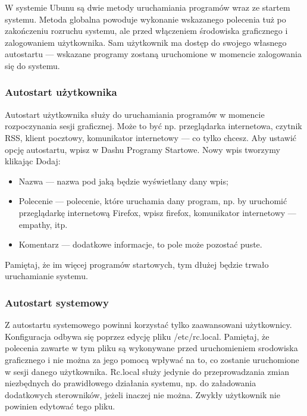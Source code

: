 W systemie Ubunu są dwie metody uruchamiania programów wraz ze startem systemu. Metoda globalna powoduje wykonanie wskazanego polecenia tuż po zakończeniu rozruchu systemu, ale przed włączeniem środowiska graficznego i zalogowaniem użytkownika. Sam użytkownik ma dostęp do swojego własnego autostartu --- wskazane programy zostaną uruchomione w momencie zalogowania się do systemu.

\subsubsection{Autostart użytkownika}
Autostart użytkownika służy do uruchamiania programów w momencie rozpoczynania sesji graficznej. Może to być np. przeglądarka internetowa, czytnik RSS, klient pocztowy, komunikator internetowy --- co tylko chcesz. Aby ustawić opcję autostartu, wpisz w Dashu \textcolor{ubuntu_orange}{Programy Startowe}. Nowy wpis tworzymy klikając \textcolor{ubuntu_orange}{Dodaj}:
\begin{itemize}
\item \textcolor{ubuntu_orange}{Nazwa} --- nazwa pod jaką będzie wyświetlany dany wpis;
\item \textcolor{ubuntu_orange}{Polecenie} --- polecenie, które uruchamia dany program, np. by uruchomić przeglądarkę internetową Firefox, wpisz \textcolor{ubuntu_orange}{firefox}, komunikator internetowy --- \textcolor{ubuntu_orange}{empathy}, itp.
\item \textcolor{ubuntu_orange}{Komentarz} --- dodatkowe informacje, to pole może pozostać puste.
\end{itemize}

Pamiętaj, że im więcej programów startowych, tym dłużej będzie trwało uruchamianie systemu.

\subsubsection{Autostart systemowy}
Z autostartu systemowego powinni korzystać tylko zaawansowani użytkownicy. Konfiguracja odbywa się poprzez edycję pliku \textcolor{ubuntu_orange}{/etc/rc.local}. Pamiętaj, że polecenia zawarte w tym pliku są wykonywane przed uruchomieniem srodowiska graficznego i nie można za jego pomocą wpływać na to, co zostanie uruchomione w sesji danego użytkownika. Rc.local służy jedynie do przeprowadzania zmian niezbędnych do prawidłowego działania systemu, np. do załadowania dodatkowych sterowników, jeżeli inaczej nie można. Zwykły użytkownik nie powinien edytować tego pliku.
